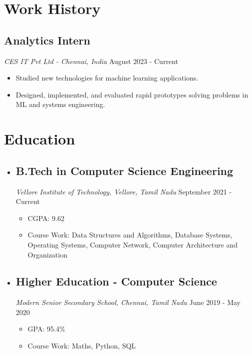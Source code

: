 \documentclass[a4paper,10pt]{article}
\begin{document}
\section*{Work History}

\subsection*{\large\textbf{Analytics Intern}} \textit{CES IT Pvt Ltd - Chennai, India} \hfill August 2023 - Current
\begin{itemize}[leftmargin=*,topsep=0pt]
    \item Studied new technologies for machine learning applications.
    \item Designed, implemented, and evaluated rapid prototypes solving problems in ML and systems engineering.
\end{itemize}

\section*{Education}

\begin{itemize}
\item
\subsection*{\large\textbf{B.Tech in Computer Science Engineering}}
\textit{Vellore Institute of Technology, Vellore, Tamil Nadu} \hfill September 2021 - Current
\begin{itemize}[label=\textasteriskcentered , leftmargin=*,topsep=0pt]
    \item CGPA: 9.62
    \item Course Work: Data Structures and Algorithms, Database Systems, Operating Systems, Computer Network, Computer Architecture and Organization
\end{itemize}
\end{itemize}

\begin{itemize}
\item
\subsection*{\large\textbf{Higher Education - Computer Science}}
\textit{Modern Senior Secondary School, Chennai, Tamil Nadu} \hfill June 2019 - May 2020
\begin{itemize}[label=\textasteriskcentered , leftmargin=*,topsep=0pt]
    \item GPA: 95.4\%
    \item Course Work: Maths, Python, SQL
\end{itemize}
\end{itemize}
\end{document}
